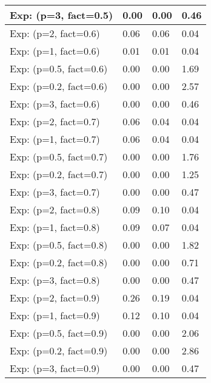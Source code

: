 \begin{table}
\begin{tabular}{llll}
\midrule
Exp: (p=3, fact=0.5)   &   0.00 &   0.00 &  0.46 \\
\midrule
Exp: (p=2, fact=0.6)   &   0.06 &   0.06 &  0.04 \\
\midrule
Exp: (p=1, fact=0.6)   &   0.01 &   0.01 &  0.04 \\
\midrule
Exp: (p=0.5, fact=0.6) &   0.00 &   0.00 &  1.69 \\
\midrule
Exp: (p=0.2, fact=0.6) &   0.00 &   0.00 &  2.57 \\
\midrule
Exp: (p=3, fact=0.6)   &   0.00 &   0.00 &  0.46 \\
\midrule
Exp: (p=2, fact=0.7)   &   0.06 &   0.04 &  0.04 \\
\midrule
Exp: (p=1, fact=0.7)   &   0.06 &   0.04 &  0.04 \\
\midrule
Exp: (p=0.5, fact=0.7) &   0.00 &   0.00 &  1.76 \\
\midrule
Exp: (p=0.2, fact=0.7) &   0.00 &   0.00 &  1.25 \\
\midrule
Exp: (p=3, fact=0.7)   &   0.00 &   0.00 &  0.47 \\
\midrule
Exp: (p=2, fact=0.8)   &   0.09 &   0.10 &  0.04 \\
\midrule
Exp: (p=1, fact=0.8)   &   0.09 &   0.07 &  0.04 \\
\midrule
Exp: (p=0.5, fact=0.8) &   0.00 &   0.00 &  1.82 \\
\midrule
Exp: (p=0.2, fact=0.8) &   0.00 &   0.00 &  0.71 \\
\midrule
Exp: (p=3, fact=0.8)   &   0.00 &   0.00 &  0.47 \\
\midrule
Exp: (p=2, fact=0.9)   &   0.26 &   0.19 &  0.04 \\
\midrule
Exp: (p=1, fact=0.9)   &   0.12 &   0.10 &  0.04 \\
\midrule
Exp: (p=0.5, fact=0.9) &   0.00 &   0.00 &  2.06 \\
\midrule
Exp: (p=0.2, fact=0.9) &   0.00 &   0.00 &  2.86 \\
\midrule
Exp: (p=3, fact=0.9)   &   0.00 &   0.00 &  0.47 \\
\midrule
\bottomrule
\end{tabular}
\end{table}